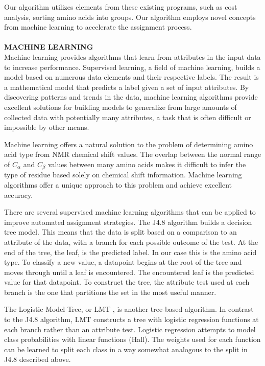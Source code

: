 \documentclass{article}
\begin{document}
Our algorithm utilizes elements from these existing programs, such as cost analysis, sorting amino acids into groups. Our algorithm employs novel concepts from machine learning to accelerate the assignment process.
\\\\
\noindent\textbf{MACHINE LEARNING}\\
Machine learning provides algorithms that learn from attributes in the input data to increase performance. Supervised learning, a field of machine learning, builds a model based on numerous data elements and their respective labels. The result is a mathematical model that predicts a label given a set of input attributes. By discovering patterns and trends in the data, machine learning algorithms provide excellent solutions for building models to generalize from large amounts of collected data with potentially many attributes, a task that is often difficult or impossible by other means.

Machine learning offers a natural solution to the problem of determining amino acid type from NMR chemical shift values. The overlap between the normal range of $C_{\alpha}$ and $C_{\beta}$ values between many amino acids makes it difficult to infer the type of residue based solely on chemical shift information. Machine learning algorithms offer a unique approach to this problem and achieve excellent accuracy.

There are several supervised machine learning algorithms that can be applied to improve automated assignment strategies. The J4.8 algorithm \cite{j48_algorithm} builds a decision tree model. This means that the data is split based on a comparison to an attribute of the data, with a branch for each possible outcome of the test. At the end of the tree, the leaf, is the predicted label. In our case this is the amino acid type. To classify a new value, a datapoint begins at the root of the tree and moves through until a leaf is encountered. The encountered leaf is the predicted value for that datapoint. To construct the tree, the attribute test used at each branch is the one that partitions the set in the most useful manner.

The Logistic Model Tree, or LMT \cite{lmt_algorithm}, is another tree-based algorithm. In contrast to the J4.8 algorithm, LMT constructs a tree with logistic regression functions at each branch rather than an attribute test. Logistic regression attempts to model class probabilities with linear functions (Hall). The weights used for each function can be learned to split each class in a way somewhat analogous to the split in J4.8 described above.
\end{document}
